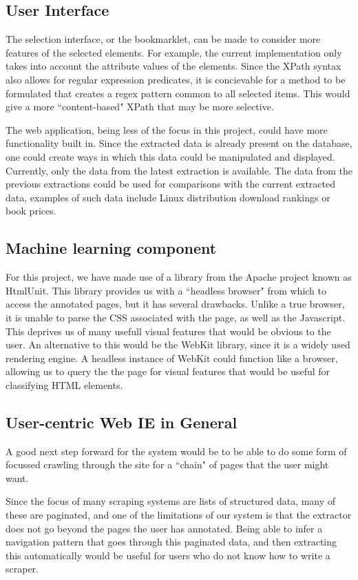 \subsection{User Interface}
The selection interface, or the bookmarklet, can be made to consider more
features of the selected elements. For example, the current implementation only takes into 
account the attribute values of the elements. Since the XPath syntax also allows for 
regular expression predicates, it is concievable for a method to be formulated that creates
a regex pattern common to all selected items. This would give a more ``content-based" XPath
that may be more selective.

The web application, being less of the focus in this project, could have more functionality
built in. Since the extracted data is already present on the database, one could create
ways in which this data could be manipulated and displayed. Currently, only the data from
the latest extraction is available. The data from the previous extractions could be used 
for comparisons with the current extracted data, examples of such data include Linux
distribution download rankings or book prices.

\subsection{Machine learning component}
For this project, we have made use of a library from the Apache project known as HtmlUnit.
This library provides us with a ``headless browser" from which to access the annotated pages,
but it has several drawbacks. Unlike a true browser, it is unable to parse the CSS associated
with the page, as well as the Javascript. This deprives us of many usefull visual features
that would be obvious to the user. An alternative to this would be the WebKit library, since
it is a widely used rendering engine. A headless instance of WebKit could function like a
browser, allowing us to query the the page for visual features that would be useful for 
classifying HTML elements.

\subsection{User-centric Web IE in General}
A good next step forward for the system would be to be able to do some form of focussed
crawling through the site for a ``chain" of pages that the user might want.

Since the focus of many scraping systems are lists of structured data, many of these are
paginated, and one of the limitations of our system is that the extractor does not go
beyond the pages the user has annotated. Being able to infer a navigation pattern that
goes through this paginated data, and then extracting this automatically would be useful
for users who do not know how to write a scraper.

